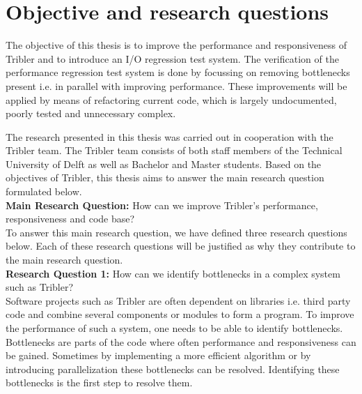 
\section{Objective and research questions}
\label{chp2:sct:objectives-research-questions}
The objective of this thesis is to improve the performance and responsiveness of Tribler and to introduce an I/O regression test system.
The verification of the performance regression test system is done by focussing on removing bottlenecks present i.e. in parallel with improving performance.
These improvements will be applied by means of refactoring current code, which is largely undocumented, poorly tested and unnecessary complex.

The research presented in this thesis was carried out in cooperation with the Tribler team. 
The Tribler team consists of both staff members of the Technical University of Delft as well as Bachelor and Master students.
Based on the objectives of Tribler, this thesis aims to answer the main research question formulated below.\\

\textbf{Main Research Question:} How can we improve Tribler's performance, responsiveness and code base?\\

To answer this main research question, we have defined three research questions below. Each of these research questions will be justified as why they contribute to the main research question.\\

\textbf{Research Question 1:} How can we identify bottlenecks in a complex system such as Tribler?\\

Software projects such as Tribler are often dependent on libraries i.e. third party code and combine several components or modules to form a program.
To improve the performance of such a system, one needs to be able to identify bottlenecks.
Bottlenecks are parts of the code where often performance and responsiveness can be gained. 
Sometimes by implementing a more efficient algorithm or by introducing parallelization these bottlenecks can be resolved.
Identifying these bottlenecks is the first step to resolve them.\\

